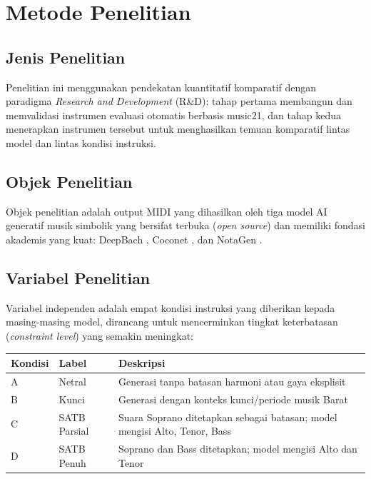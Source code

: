 \section{Metode Penelitian}

\subsection{Jenis Penelitian}

Penelitian ini menggunakan pendekatan kuantitatif komparatif dengan paradigma \textit{Research and Development} (R\&D): tahap pertama membangun dan memvalidasi instrumen evaluasi otomatis berbasis music21, dan tahap kedua menerapkan instrumen tersebut untuk menghasilkan temuan komparatif lintas model dan lintas kondisi instruksi.

\subsection{Objek Penelitian}

Objek penelitian adalah output MIDI yang dihasilkan oleh tiga model AI generatif musik simbolik yang bersifat terbuka (\textit{open source}) dan memiliki fondasi akademis yang kuat: DeepBach \parencite{hadjeres2017}, Coconet \parencite{huang2017}, dan NotaGen \parencite{wang2025}.

\subsection{Variabel Penelitian}

Variabel independen adalah empat kondisi instruksi yang diberikan kepada masing-masing model, dirancang untuk mencerminkan tingkat keterbatasan (\textit{constraint level}) yang semakin meningkat:

\begin{table}[ht]
\centering
\begin{tabularx}{\textwidth}{|l|l|X|}
\hline
\textbf{Kondisi} & \textbf{Label} & \textbf{Deskripsi} \\ \hline
A & Netral & Generasi tanpa batasan harmoni atau gaya eksplisit \\ \hline
B & Kunci & Generasi dengan konteks kunci/periode musik Barat \\ \hline
C & SATB Parsial & Suara Soprano ditetapkan sebagai batasan; model mengisi Alto, Tenor, Bass \\ \hline
D & SATB Penuh & Soprano dan Bass ditetapkan; model mengisi Alto dan Tenor \\ \hline
\end{tabularx}
\end{table}

